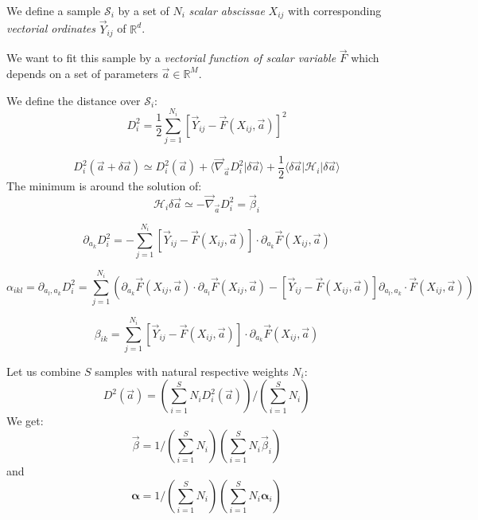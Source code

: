 \documentclass[aps,12pt]{revtex4}
\begin{document}
We define a sample $\mathcal{S}_i$ 
by a set of $N_i$ \emph{scalar abscissae} $X_{ij}$ with corresponding \emph{vectorial ordinates} $\vec{Y}_{ij}$ of $\mathbb{R}^d$.

We want to fit this sample by a \emph{vectorial function of scalar variable} $\vec{F}$ which depends on a set of parameters $\vec{a}\in\mathbb{R}^M$.

We define the distance over $\mathcal{S}_i$:
\begin{equation}
	D^2_i = \dfrac{1}{2}\sum_{j=1}^{N_i} \left[ \vec{Y}_{ij} - \vec{F}(X_{ij},\vec{a})\right]^2
\end{equation}

\begin{equation}
	D^2_i(\vec{a}+\delta\vec{a}) \simeq D^2_i(\vec{a}) + \langle \vec{\nabla}_{\vec{a}} D^2_i \vert \delta \vec{a} \rangle
	+ \dfrac{1}{2} \langle \delta\vec{a} \vert \mathcal{H}_i \vert \delta \vec{a} \rangle
\end{equation}
The minimum is around the solution of:
\begin{equation}
	\mathcal{H}_i   \delta \vec{a}  \simeq -\vec{\nabla}_{\vec{a}} D^2_i = \vec{\beta}_i
\end{equation}

\begin{equation}
	 \partial_{a_k}D^2_i = -\sum_{j=1}^{N_i} \left[ \vec{Y}_{ij} - \vec{F}(X_{ij},\vec{a})\right] \cdot \partial_{a_k}\vec{F}(X_{ij},\vec{a})
\end{equation}

\begin{equation}
	\alpha_{ikl} = \partial_{a_l,a_k} D^2_i 
	= \sum_{j=1}^{N_i} \left(
	\partial_{a_k}\vec{F}(X_{ij},\vec{a}) \cdot \partial_{a_l}\vec{F}(X_{ij},\vec{a})
	- \left[ \vec{Y}_{ij} - \vec{F}(X_{ij},\vec{a})\right] \partial_{a_l,a_k}\cdot\vec{F}(X_{ij},\vec{a})  \right)
\end{equation}

\begin{equation}
	\beta_{ik} = \sum_{j=1}^{N_i} \left[ \vec{Y}_{ij} - \vec{F}(X_{ij},\vec{a})\right] \cdot \partial_{a_k}\vec{F}(X_{ij},\vec{a})
\end{equation}

Let us combine $S$ samples with natural respective weights $N_i$:
\begin{equation}
	 D^2(\vec{a}) = \left(\sum_{i=1}^S N_i D^2_i(\vec{a}) \right) /  \left(\sum_{i=1}^S N_i \right)
\end{equation}
We get:
\begin{equation}
	\vec{\beta} = 1/\left(\sum_{i=1}^S N_i \right) \left( \sum_{i=1}^S N_i \vec{\beta}_i\right)
\end{equation}
and
\begin{equation}
		 \bm{\alpha} = 1/\left(\sum_{i=1}^S N_i \right) \left( \sum_{i=1}^S N_i \bm{\alpha}_i\right)
\end{equation}
\end{document}
